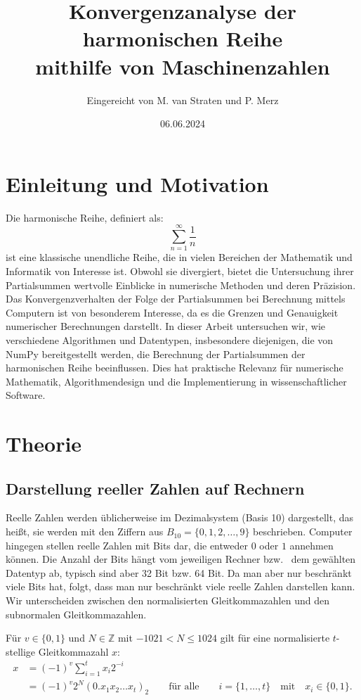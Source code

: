\documentclass{scrartcl}
\title{Konvergenzanalyse der harmonischen Reihe\\
mithilfe von Maschinenzahlen}
\author{
  Eingereicht von M. van Straten und P. Merz
}
\date{06.06.2024}
\begin{document}
\maketitle
\cleardoublepage{}
\tableofcontents
\cleardoublepage{}

\section{Einleitung und Motivation}
Die harmonische Reihe, definiert als: \[ \sum_{n=1}^{\infty} \frac{1}{n} \] ist
eine klassische unendliche Reihe, die in vielen Bereichen der Mathematik und
Informatik von Interesse ist.
Obwohl sie divergiert, bietet die Untersuchung ihrer Partialsummen wertvolle
Einblicke in numerische Methoden und deren Präzision.
Das Konvergenzverhalten der Folge der Partialsummen bei Berechnung mittels
Computern ist von besonderem Interesse, da es die Grenzen und Genauigkeit
numerischer Berechnungen darstellt.
In dieser Arbeit untersuchen wir, wie verschiedene Algorithmen und Datentypen,
insbesondere diejenigen, die von NumPy bereitgestellt werden, die Berechnung
der Partialsummen der harmonischen Reihe beeinflussen.
Dies hat praktische Relevanz für numerische Mathematik, Algorithmendesign und
die Implementierung in wissenschaftlicher Software.

\section{Theorie}
\subsection{Darstellung reeller Zahlen auf Rechnern}
Reelle Zahlen werden üblicherweise im Dezimalsystem (Basis 10) dargestellt, das
heißt, sie werden mit den Ziffern aus \( B_{10} = \{0, 1, 2, \dots, 9\} \)
beschrieben.
Computer hingegen stellen reelle Zahlen mit Bits dar, die entweder \(0\) oder
\(1\) annehmen können.
Die Anzahl der Bits hängt vom jeweiligen Rechner bzw.
\ dem gewählten Datentyp ab, typisch sind aber 32 Bit bzw. 64 Bit.
Da man aber nur beschränkt viele Bits hat, folgt, dass man nur beschränkt viele
reelle Zahlen darstellen kann.
Wir unterscheiden zwischen den normalisierten Gleitkommazahlen und den
subnormalen Gleitkommazahlen.

Für \( v \in \{0, 1\} \) und \( N \in \mathbb{Z} \) mit \( -1021 < N \leq 1024 \) gilt für eine normalisierte \( t \)-stellige Gleitkommazahl \( x \):
\begin{align*}
    x & = {(-1)}^v \sum_{i=1}^t x_i 2^{-i}                                                                                                \\
      & = (-1)^v 2^N (0.x_1 x_2 \ldots x_t)_2 \qquad \text{für alle} \qquad i = \{1, \ldots, t\} \quad \text{mit} \quad x_i \in \{0, 1\}.
\end{align*}
\end{document}
